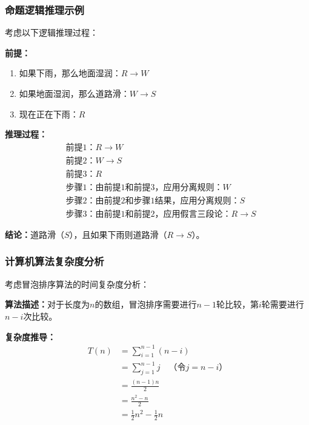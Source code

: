 \documentclass{article}
\begin{document}
\subsubsection{命题逻辑推理示例}

考虑以下逻辑推理过程：

\textbf{前提：}
\begin{enumerate}
    \item 如果下雨，那么地面湿润：$R \rightarrow W$
    \item 如果地面湿润，那么道路滑：$W \rightarrow S$
    \item 现在正在下雨：$R$
\end{enumerate}

\textbf{推理过程：}
\begin{align}
     & \text{前提1：} R \rightarrow W                  \\
     & \text{前提2：} W \rightarrow S                  \\
     & \text{前提3：} R                                \\
     & \text{步骤1：由前提1和前提3，应用分离规则：} W                \\
     & \text{步骤2：由前提2和步骤1结果，应用分离规则：} S              \\
     & \text{步骤3：由前提1和前提2，应用假言三段论：} R \rightarrow S
\end{align}

\textbf{结论：}道路滑（$S$），且如果下雨则道路滑（$R \rightarrow S$）。

\subsubsection{计算机算法复杂度分析}

考虑冒泡排序算法的时间复杂度分析：

\textbf{算法描述：}对于长度为$n$的数组，冒泡排序需要进行$n-1$轮比较，第$i$轮需要进行$n-i$次比较。

\textbf{复杂度推导：}
\begin{align}
    T(n) & = \sum_{i=1}^{n-1} (n-i)                       \\
         & = \sum_{j=1}^{n-1} j \quad \text{（令$j = n-i$）} \\
         & = \frac{(n-1)n}{2}                             \\
         & = \frac{n^2 - n}{2}                            \\
         & = \frac{1}{2}n^2 - \frac{1}{2}n
\end{align}
\end{document}
